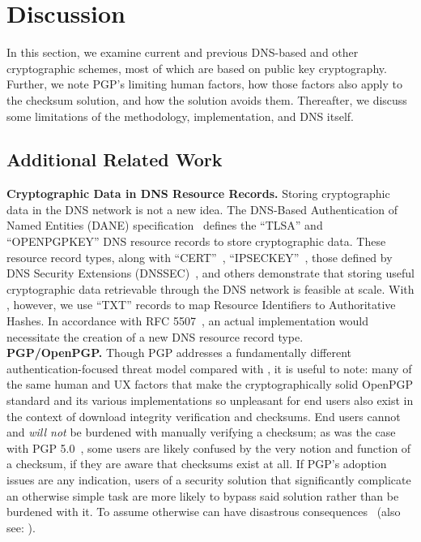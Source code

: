 \section{Discussion} \label{sec:discussion}

In this section, we examine current and previous DNS-based and other
cryptographic schemes, most of which are based on public key cryptography.
Further, we note PGP's limiting human factors, how those factors also apply to
the checksum solution, and how the \SYSTEM{} solution avoids them. Thereafter,
we discuss some limitations of the \SYSTEM{} methodology, implementation, and
DNS itself.

\subsection{Additional Related Work}

\noindent\textbf{Cryptographic Data in DNS Resource Records.} 
Storing
cryptographic data in the DNS network is not a new idea. The DNS-Based
Authentication of Named Entities (DANE) specification~\cite{DANE1, DANE2, DANE3}
defines the ``TLSA'' and ``OPENPGPKEY'' DNS resource records to store
cryptographic data. These resource record types, along with
``CERT''~\cite{CERT}, ``IPSECKEY''~\cite{IPSECKEY}, those defined by DNS
Security Extensions (DNSSEC)~\cite{DNSSEC}, and others demonstrate that storing
useful cryptographic data retrievable through the DNS network is feasible at
scale. With \SYSTEM{}, however, we use ``TXT'' records to map Resource
Identifiers to Authoritative Hashes. In accordance with RFC 5507~\cite{RFC5507},
an actual \SYSTEM{} implementation would necessitate the creation of a new DNS
resource record type. \\

\noindent\textbf{PGP/OpenPGP.} Though PGP addresses a fundamentally different
authentication-focused threat model compared with \SYSTEM{}, it is useful to
note: many of the same human and UX factors that make the cryptographically
solid OpenPGP standard and its various implementations so unpleasant for end
users also exist in the context of download integrity verification and
checksums. End users cannot and \textit{will not} be burdened with manually
verifying a checksum; as was the case with PGP 5.0~\cite{PGPBad}, some users are
likely confused by the very notion and function of a checksum, if they are aware
that checksums exist at all. If PGP's adoption issues are any indication, users
of a security solution that significantly complicate an otherwise simple task
are more likely to bypass said solution rather than be burdened with it. To
assume otherwise can have disastrous consequences~\cite{PGPBad} (also see:
). \\

